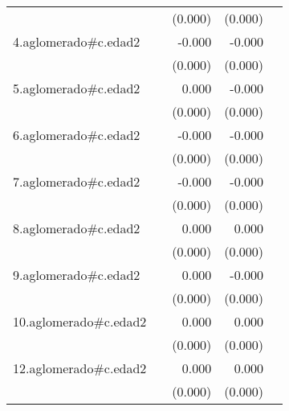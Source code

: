 {\begin{longtable}{l*{4}{D{.}{.}{-1}}}
            &                     &     (0.000)         &     (0.000)         &                     \\
\addlinespace
4.aglomerado#c.edad2&                     &      -0.000         &      -0.000\sym{*}  &                     \\
            &                     &     (0.000)         &     (0.000)         &                     \\
\addlinespace
5.aglomerado#c.edad2&                     &       0.000         &      -0.000         &                     \\
            &                     &     (0.000)         &     (0.000)         &                     \\
\addlinespace
6.aglomerado#c.edad2&                     &      -0.000         &      -0.000\sym{***}&                     \\
            &                     &     (0.000)         &     (0.000)         &                     \\
\addlinespace
7.aglomerado#c.edad2&                     &      -0.000         &      -0.000         &                     \\
            &                     &     (0.000)         &     (0.000)         &                     \\
\addlinespace
8.aglomerado#c.edad2&                     &       0.000         &       0.000         &                     \\
            &                     &     (0.000)         &     (0.000)         &                     \\
\addlinespace
9.aglomerado#c.edad2&                     &       0.000         &      -0.000         &                     \\
            &                     &     (0.000)         &     (0.000)         &                     \\
\addlinespace
10.aglomerado#c.edad2&                     &       0.000         &       0.000         &                     \\
            &                     &     (0.000)         &     (0.000)         &                     \\
\addlinespace
12.aglomerado#c.edad2&                     &       0.000\sym{*}  &       0.000         &                     \\
            &                     &     (0.000)         &     (0.000)         &                     \\

\end{longtable}}
